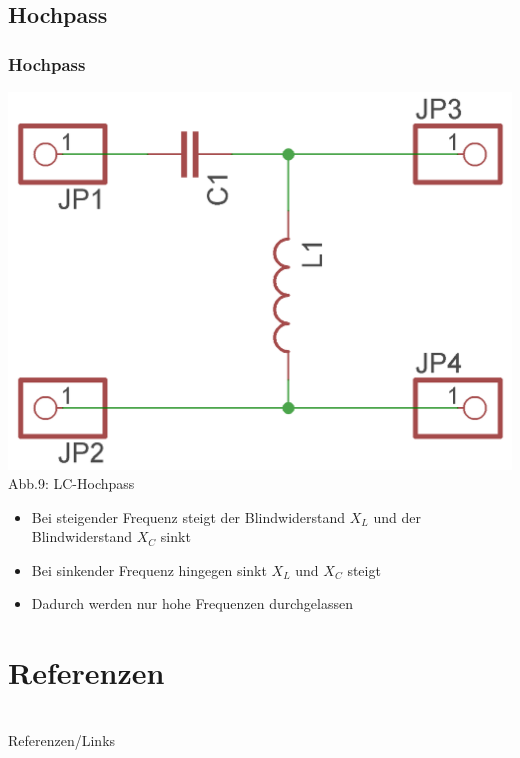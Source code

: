 \subsection*{Hochpass}
\begin{frame}
\frametitle{Hochpass}
\begin{center}
	\includegraphics[width=\textwidth,height=.5\textheight,keepaspectratio]{e07/LC-Hochpass.png}\\
	Abb.9: LC-Hochpass
\end{center}
\begin{itemize}
	\item Bei steigender Frequenz steigt der Blindwiderstand $X_L$ und der Blindwiderstand $X_C$ sinkt
	\item Bei sinkender Frequenz hingegen sinkt $X_L$ und $X_C$ steigt
	\item Dadurch werden nur hohe Frequenzen durchgelassen 
\end{itemize}
\end{frame}


\section*{Referenzen}

\renewcommand{\refname}{Referenzen}

\hypertarget{refs}{}
\textcolor{white}{} \\ %
\Large Referenzen/Links
\footnotesize

